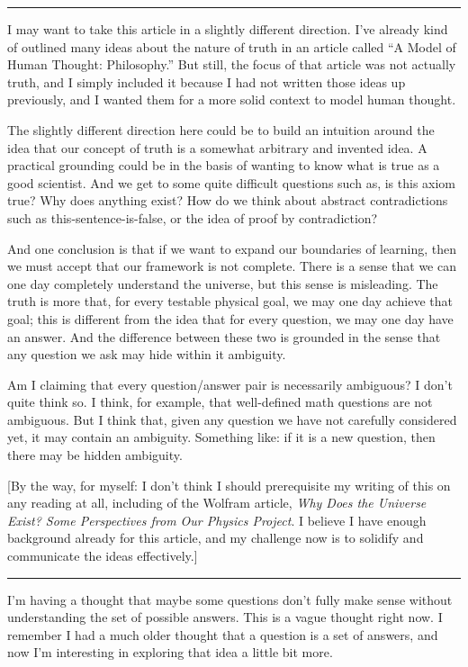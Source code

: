\documentclass[11pt, oneside]{article}   	%
\begin{document}
\bigskip
\hrule
\bigskip

I may want to take this article in a slightly different direction. I've already
kind of outlined many ideas about the nature of truth in an article called ``A
Model of Human Thought: Philosophy.'' But still, the focus of that article was
not actually truth, and I simply included it because I had not written those
ideas up previously, and I wanted them for a more solid context to model human
thought.

The slightly different direction here could be to build an intuition around the
idea that our concept of truth is a somewhat arbitrary and invented idea. A
practical grounding could be in the basis of wanting to know what is true as a
good scientist. And we get to some quite difficult questions such as, is this
axiom true? Why does anything exist? How do we think about abstract
contradictions such as this-sentence-is-false, or the idea of proof by
contradiction?

And one conclusion is that if we want to expand our boundaries of learning, then
we must accept that our framework is not complete. There is a sense that we can
one day completely understand the universe, but this sense is misleading. The
truth is more that, for every testable physical goal, we may one day achieve
that goal; this is different from the idea that for every question, we may one
day have an answer. And the difference between these two is grounded in the
sense that any question we ask may hide within it ambiguity.

Am I claiming that every question/answer pair is necessarily ambiguous? I don't
quite think so. I think, for example, that well-defined math questions are not
ambiguous. But I think that, given any question we have not carefully considered
yet, it may contain an ambiguity. Something like: if it is a new question, then
there may be hidden ambiguity.

[By the way, for myself: I don't think I should prerequisite my writing of this
on any reading at all, including of the Wolfram article, {\em Why Does the
Universe Exist? Some Perspectives from Our Physics Project}. I believe I have
enough background already for this article, and my challenge now is to solidify
and communicate the ideas effectively.]

\bigskip
\hrule
\bigskip

I'm having a thought that maybe some questions don't fully make sense without
understanding the set of possible answers. This is a vague thought right now. I
remember I had a much older thought that a question is a set of answers, and now
I'm interesting in exploring that idea a little bit more.
\end{document}

